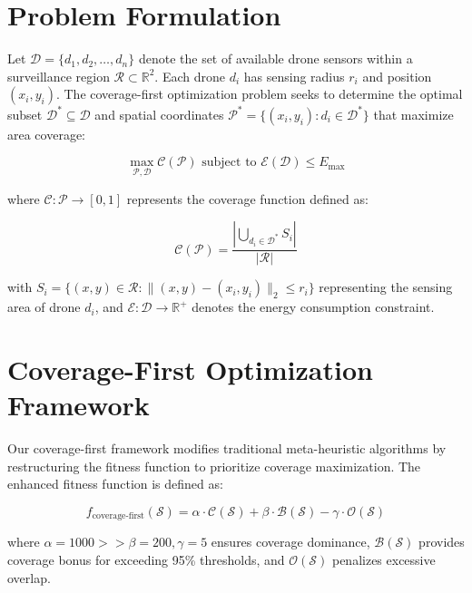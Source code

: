 \documentclass[conference]{IEEEtran}
\begin{document}
\section{Problem Formulation}

Let $\mathcal{D} = \{d_1, d_2, \ldots, d_n\}$ denote the set of available drone sensors within a surveillance region $\mathcal{R} \subset \mathbb{R}^2$. Each drone $d_i$ has sensing radius $r_i$ and position $(x_i, y_i)$. The coverage-first optimization problem seeks to determine the optimal subset $\mathcal{D}^* \subseteq \mathcal{D}$ and spatial coordinates $\mathcal{P}^* = \{(x_i, y_i) : d_i \in \mathcal{D}^*\}$ that maximize area coverage:

\begin{equation}
\max_{\mathcal{P},\mathcal{D}} \mathcal{C}(\mathcal{P}) \text{ subject to } \mathcal{E}(\mathcal{D}) \leq E_{\text{max}}
\end{equation}

where $\mathcal{C}: \mathcal{P} \rightarrow [0,1]$ represents the coverage function defined as:

\begin{equation}
\mathcal{C}(\mathcal{P}) = \frac{|\bigcup_{d_i \in \mathcal{D}^*} S_i|}{|\mathcal{R}|}
\end{equation}

with $S_i = \{(x,y) \in \mathcal{R} : \|(x,y) - (x_i,y_i)\|_2 \leq r_i\}$ representing the sensing area of drone $d_i$, and $\mathcal{E}: \mathcal{D} \rightarrow \mathbb{R}^+$ denotes the energy consumption constraint.

\section{Coverage-First Optimization Framework}

Our coverage-first framework modifies traditional meta-heuristic algorithms by restructuring the fitness function to prioritize coverage maximization. The enhanced fitness function is defined as:

\begin{equation}
f_{\text{coverage-first}}(\mathcal{S}) = \alpha \cdot \mathcal{C}(\mathcal{S}) + \beta \cdot \mathcal{B}(\mathcal{S}) - \gamma \cdot \mathcal{O}(\mathcal{S})
\end{equation}

where $\alpha = 1000 >> \beta = 200, \gamma = 5$ ensures coverage dominance, $\mathcal{B}(\mathcal{S})$ provides coverage bonus for exceeding 95\% thresholds, and $\mathcal{O}(\mathcal{S})$ penalizes excessive overlap.
\end{document}
